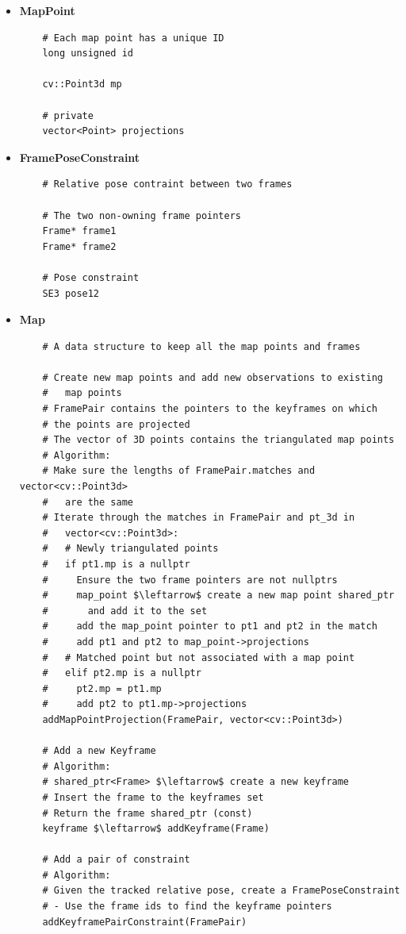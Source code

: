 \begin{itemize}
  \item \textbf{MapPoint}
  \begin{verbatim}
    # Each map point has a unique ID
    long unsigned id

    cv::Point3d mp

    # private
    vector<Point> projections
  \end{verbatim}

  \item \textbf{FramePoseConstraint}
  \begin{lstlisting}
    # Relative pose contraint between two frames
    
    # The two non-owning frame pointers
    Frame* frame1 
    Frame* frame2

    # Pose constraint
    SE3 pose12

  \end{lstlisting}

  \item \textbf{Map}
  \begin{lstlisting}
    # A data structure to keep all the map points and frames

    # Create new map points and add new observations to existing
    #   map points
    # FramePair contains the pointers to the keyframes on which 
    # the points are projected
    # The vector of 3D points contains the triangulated map points
    # Algorithm:
    # Make sure the lengths of FramePair.matches and vector<cv::Point3d>
    #   are the same
    # Iterate through the matches in FramePair and pt_3d in 
    #   vector<cv::Point3d>:
    #   # Newly triangulated points
    #   if pt1.mp is a nullptr
    #     Ensure the two frame pointers are not nullptrs
    #     map_point $\leftarrow$ create a new map point shared_ptr 
    #       and add it to the set
    #     add the map_point pointer to pt1 and pt2 in the match
    #     add pt1 and pt2 to map_point->projections
    #   # Matched point but not associated with a map point
    #   elif pt2.mp is a nullptr 
    #     pt2.mp = pt1.mp 
    #     add pt2 to pt1.mp->projections
    addMapPointProjection(FramePair, vector<cv::Point3d>)

    # Add a new Keyframe
    # Algorithm:
    # shared_ptr<Frame> $\leftarrow$ create a new keyframe
    # Insert the frame to the keyframes set
    # Return the frame shared_ptr (const)
    keyframe $\leftarrow$ addKeyframe(Frame)

    # Add a pair of constraint
    # Algorithm:
    # Given the tracked relative pose, create a FramePoseConstraint
    # - Use the frame ids to find the keyframe pointers 
    addKeyframePairConstraint(FramePair)


\end{lstlisting}
\end{itemize}
